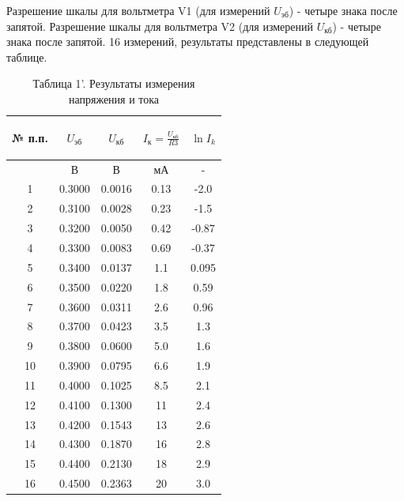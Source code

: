 Разрешение шкалы для вольтметра V1 (для измерений $U_{\text{эб}}$) - четыре знака после запятой. Разрешение шкалы для вольтметра V2 (для измерений $U_{\text{кб}}$) - четыре знака после запятой. 16 измерений, результаты представлены в следующей таблице.
\begin{center}
\begin{table}[H]
\centering
\caption*{Таблица 1'. Результаты измерения напряжения и тока}
\label{table:t1'}
\begin{tabular}{|c|c|c|c|c|}
\hline
\begin{minipage}{7mm}
    № п.п. 
\end{minipage}&
\begin{minipage}{3cm}
   \begin{center} $U_{\text{эб}}$ \end{center}
\end{minipage} &
\begin{minipage}{3cm}
   \begin{center} $U_{\text{кб}}$ \end{center}
\end{minipage} &
\begin{minipage}{3cm}
    \begin{center} $I_{\text{к}}=\frac{U_{\text{кб}}}{R3}$ \end{center}
\end{minipage}&
\begin{minipage}{3cm}
   \begin{center} $\ln I_k$ \end{center}
\end{minipage}\\
\hline
{}&В&В&мА&-\\
\hline
1 &  0.3000  &  0.0016  & 0.13  & -2.0 \\
2 &  0.3100  &  0.0028  & 0.23  & -1.5\\
3 &  0.3200  &  0.0050  & 0.42  & -0.87\\
4 & 0.3300  &  0.0083  & 0.69  & -0.37\\
5 & 0.3400  &  0.0137  &  1.1 & 0.095\\
6 & 0.3500  &  0.0220  &  1.8 & 0.59\\
7 & 0.3600  &  0.0311  &  2.6 & 0.96\\
8 & 0.3700  &  0.0423  &  3.5 & 1.3\\
9& 0.3800  &  0.0600 &  5.0 &  1.6\\
10 &  0.3900 &  0.0795  &  6.6 & 1.9 \\
11 &  0.4000  &  0.1025  &  8.5 & 2.1\\
12 &  0.4100  & 0.1300 &  11 & 2.4\\
13 & 0.4200 &  0.1543  &  13 & 2.6\\
14 & 0.4300  &  0.1870  &  16 & 2.8\\
15 & 0.4400  &  0.2130  &  18 & 2.9\\
16 & 0.4500  &  0.2363  &  20 & 3.0\\
\hline
\end{tabular}
\end{table}
\end{center}
